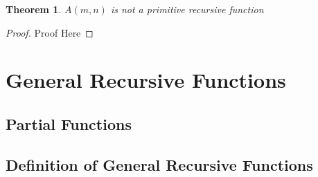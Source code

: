 \documentclass[12pt, letterpaper]{article}
\newtheorem{theorem}{Theorem}
\begin{document}
    \begin{theorem}
      $A(m, n)$ is not a primitive recursive function
    \end{theorem}
    \begin{proof}
      Proof Here
    \end{proof}


  \section{General Recursive Functions}
    \subsection{Partial Functions}
    \subsection{Definition of General Recursive Functions}
\end{document}
